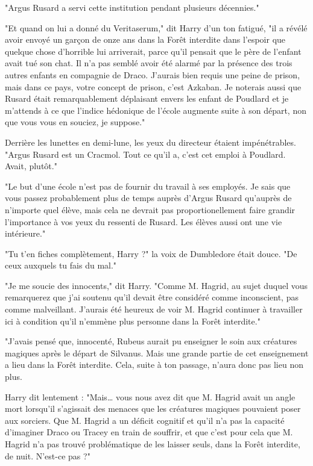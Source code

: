 "Argus Rusard a servi cette institution pendant plusieurs décennies."

"Et quand on lui a donné du Veritaserum," dit Harry d'un ton fatigué, "il a révélé avoir envoyé un garçon de onze ans dans la Forêt interdite dans l'espoir que quelque chose d'horrible lui arriverait, parce qu'il pensait que le père de l'enfant avait tué son chat. Il n'a pas semblé avoir été alarmé par la présence des trois autres enfants en compagnie de Draco. J'aurais bien requis une peine de prison, mais dans ce pays, votre concept de prison, c'est Azkaban. Je noterais aussi que Rusard était remarquablement déplaisant envers les enfant de Poudlard et je m'attends à ce que l'indice hédonique de l'école augmente suite à son départ, non que vous vous en souciez, je suppose."

Derrière les lunettes en demi-lune, les yeux du directeur étaient impénétrables. "Argus Rusard est un Cracmol. Tout ce qu'il a, c'est cet emploi à Poudlard. Avait, plutôt."

"Le but d'une école n'est pas de fournir du travail à ses employés. Je sais que vous passez probablement plus de temps auprès d'Argus Rusard qu'auprès de n'importe quel élève, mais cela ne devrait pas proportionellement faire grandir l'importance à vos yeux du ressenti de Rusard. Les élèves aussi ont une vie intérieure."

"Tu t'en fiches complètement, Harry ?" la voix de Dumbledore était douce. "De ceux auxquels tu fais du mal."

"Je me soucie des innocents," dit Harry. "Comme M. Hagrid, au sujet duquel vous remarquerez que j'ai soutenu qu'il devait être considéré comme inconscient, pas comme malveillant. J'aurais été heureux de voir M. Hagrid continuer à travailler ici à condition qu'il n'emmène plus personne dans la Forêt interdite."

"J'avais pensé que, innocenté, Rubeus aurait pu enseigner le soin aux créatures magiques après le départ de Silvanus. Mais une grande partie de cet enseignement a lieu dans la Forêt interdite. Cela, suite à ton passage, n'aura donc pas lieu non plus.

Harry dit lentement : "Mais… vous nous avez dit que M. Hagrid avait un angle mort lorsqu'il s'agissait des menaces que les créatures magiques pouvaient poser aux sorciers. Que M. Hagrid a un déficit cognitif et qu'il n'a pas la capacité d'imaginer Draco ou Tracey en train de souffrir, et que c'est pour cela que M. Hagrid n'a pas trouvé problématique de les laisser seuls, dans la Forêt interdite, de nuit. N'est-ce pas ?"

